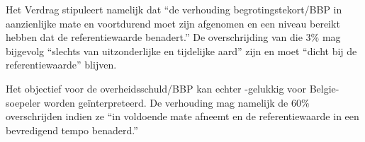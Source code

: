 Het Verdrag stipuleert namelijk dat ``de verhouding
begrotingstekort/BBP in aanzienlijke mate en voortdurend moet zijn
afgenomen en een niveau bereikt hebben dat de referentiewaarde
benadert.'' De overschrijding van die 3\% mag bijgevolg ``slechts
van uitzonderlijke en tijdelijke aard'' zijn en moet ``dicht bij de
referentiewaarde'' blijven.

Het objectief voor de overheidsschuld/BBP kan echter -gelukkig voor
Belgie- soepeler worden ge\"interpreteerd. De verhouding mag namelijk
de 60\% overschrijden indien ze ``in voldoende mate afneemt en de
referentiewaarde in een bevredigend tempo benaderd.''
